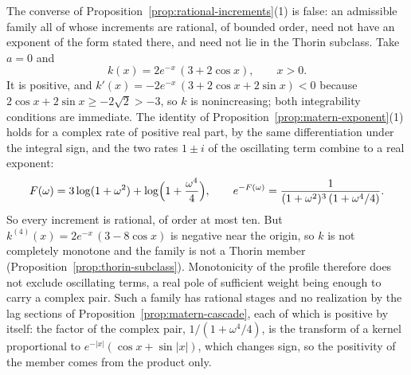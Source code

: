 \begin{remark}
\label{rem:rational-converse}
The converse of Proposition~\ref{prop:rational-increments}(1) is false: an admissible family all of whose
increments are rational, of bounded order, need not have an exponent of the form stated there,
and need not lie in the Thorin subclass. Take $a = 0$ and
\[
  k(x) = 2e^{-x}\,(3 + 2\cos x), \qquad x > 0 .
\]
It is positive, and $k'(x) = -2e^{-x}\,(3 + 2\cos x + 2\sin x) < 0$ because
$2\cos x + 2\sin x \ge -2\sqrt2 > -3$, so $k$ is nonincreasing; both integrability conditions
are immediate. The identity of Proposition~\ref{prop:matern-exponent}(1) holds for a complex rate of
positive real part, by the same differentiation under the integral sign, and the two rates
$1 \pm i$ of the oscillating term combine to a real exponent:
\[
  F(\omega) = 3\log(1 + \omega^2) + \log\Bigl(1 + \frac{\omega^4}{4}\Bigr),
  \qquad
  e^{-F(\omega)} = \frac{1}{(1+\omega^2)^3\,(1 + \omega^4/4)} .
\]
So every increment is rational, of order at most ten. But
$k^{(4)}(x) = 2e^{-x}\,(3 - 8\cos x)$ is negative near the origin, so $k$ is not completely
monotone and the family is not a Thorin member (Proposition~\ref{prop:thorin-subclass}). Monotonicity of the
profile therefore does not exclude oscillating terms, a real pole of sufficient weight being
enough to carry a complex pair. Such a family has rational stages and no realization by the
lag sections of Proposition~\ref{prop:matern-cascade}, each of which is positive by itself: the factor
of the complex pair, $1/(1 + \omega^4/4)$, is the transform of a kernel proportional to
$e^{-|x|}(\cos x + \sin|x|)$, which changes sign, so the positivity of the member comes from
the product only.


\end{remark}
